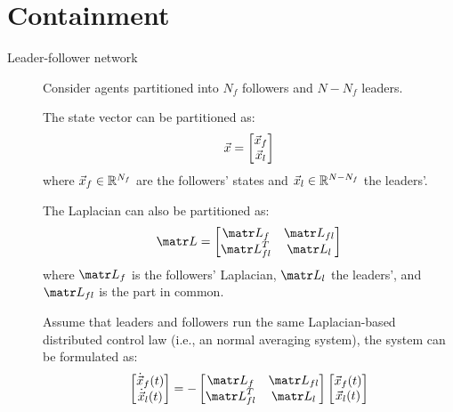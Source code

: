 \chapter{Containment}


\begin{description}
    \item[Leader-follower network] 
        Consider agents partitioned into $N_f$ followers and $N-N_f$ leaders.
        
        The state vector can be partitioned as:
        \[ {\vec{x}} = \begin{bmatrix} {\vec{x}}_f \\ {\vec{x}}_l \end{bmatrix} \]
        where ${\vec{x}}_f \in \mathbb{R}^{N_f}$ are the followers' states and ${\vec{x}}_l \in \mathbb{R}^{N-N_f}$ the leaders'.
        
        The Laplacian can also be partitioned as:
        \[
            \lap = \begin{bmatrix} \lap_f & \lap_{fl} \\ \lap_{fl}^T & \lap_l \end{bmatrix}
        \]
        where $\lap_f$ is the followers' Laplacian, $\lap_l$ the leaders', and $\lap_{fl}$ is the part in common.

        Assume that leaders and followers run the same Laplacian-based distributed control law (i.e., an normal averaging system), the system can be formulated as:
        \[
            \begin{bmatrix} \dot{\x}_f(t) \\ \dot{\x}_l(t) \end{bmatrix} =
            - \begin{bmatrix} \lap_f & \lap_{fl} \\ \lap_{fl}^T & \lap_l \end{bmatrix}
            \begin{bmatrix} \x_f(t) \\ \x_l(t) \end{bmatrix}
        \]


\end{description}
